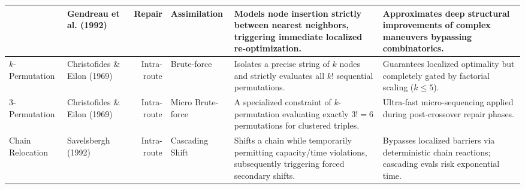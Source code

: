 \documentclass[10pt, a4paper]{article}
\begin{document}
\begin{center}
\begin{longtable}
{GENI} & Gendreau et al. (1992) & Repair & Assimilation & Models node insertion strictly between nearest neighbors, triggering immediate localized re-optimization. & Approximates deep structural improvements of complex maneuvers bypassing combinatorics. \\ \midrule
{$k$-Permutation} & Christofides \& Eilon (1969)& Intra-route & Brute-force & Isolates a precise string of $k$ nodes and strictly evaluates all $k!$ sequential permutations. & Guarantees localized optimality but completely gated by factorial scaling ($k \le 5$). \\ \midrule
{3-Permutation} & Christofides \& Eilon (1969)& Intra-route & Micro Brute-force& A specialized constraint of $k$-permutation evaluating exactly $3! = 6$ permutations for clustered triples. & Ultra-fast micro-sequencing applied during post-crossover repair phases. \\ \midrule
{Chain Relocation} & Savelsbergh (1992) & Intra-route & Cascading Shift & Shifts a chain while temporarily permitting capacity/time violations, subsequently triggering forced secondary shifts. & Bypasses localized barriers via deterministic chain reactions; cascading evals risk exponential time. \\ \midrule


\end{longtable}
\end{center}
\end{document}
